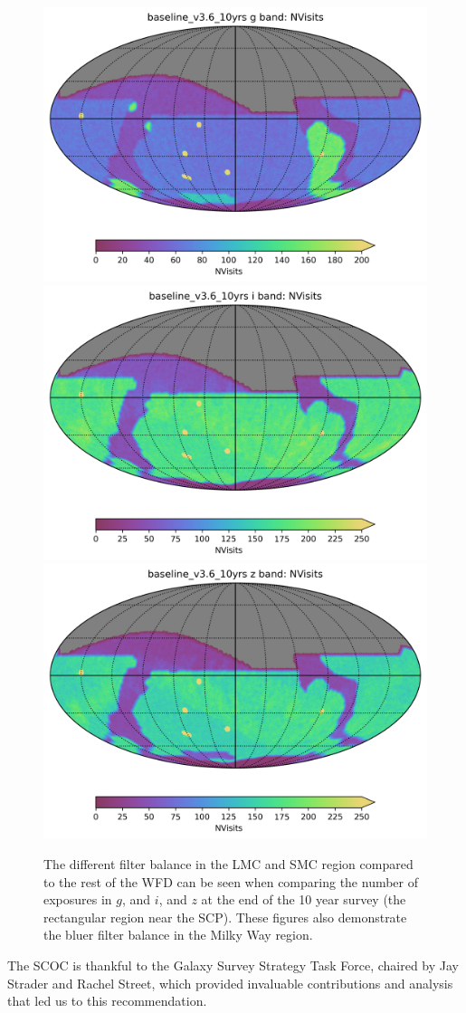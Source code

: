 \begin{figure}
    \centering
    \includegraphics[width=0.32\linewidth]{figures/baseline_v3_6_10yrs_NVisits_g_band_HEAL_SkyMap.png}\includegraphics[width=0.32\linewidth]{figures/baseline_v3_6_10yrs_NVisits_i_band_HEAL_SkyMap.png}\includegraphics[width=0.32\linewidth]{figures/baseline_v3_6_10yrs_NVisits_z_band_HEAL_SkyMap.png}
    \caption{The different filter balance in the LMC and SMC region compared to the rest of the WFD can be seen when comparing the number of exposures in $g$, and $i$, and $z$ at the end of the 10 year survey (the rectangular region near the SCP). These figures also demonstrate the bluer filter
    balance in the Milky Way region.}
    \label{fig:enter-label}
\end{figure}

The SCOC is thankful to the Galaxy Survey Strategy Task Force, chaired by Jay Strader and Rachel Street, which provided invaluable contributions and analysis that led us to this recommendation.






